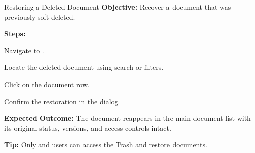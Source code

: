 \vspace{8pt}

\begin{ugTask}{Restoring a Deleted Document}
  \textbf{Objective:} Recover a document that was previously
  soft-deleted.

  \textbf{Steps:}
  \begin{ugSteps}
    \item Navigate to .
    \item Locate the deleted document using search or filters.
    \item Click  on the document row.
    \item Confirm the restoration in the dialog.
  \end{ugSteps}

  \textbf{Expected Outcome:} The document reappears in the
  main document list with its original status, versions, and
  access controls intact.

  \textbf{Tip:} Only  and  users
  can access the Trash and restore documents.
\end{ugTask}

\newpage

